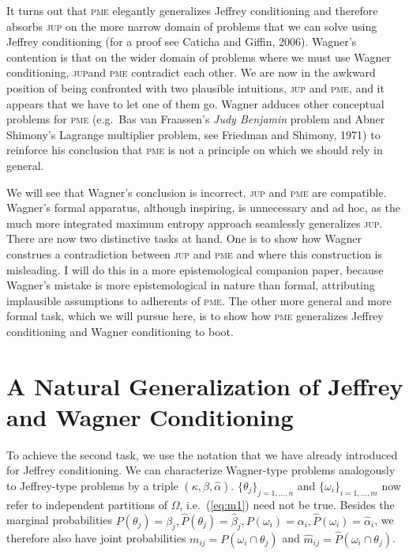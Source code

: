 \documentclass[entropy,article,submit,oneauthor,pdftex,12pt,a4paper]{mdpi}
\begin{document}
It turns out that \textsc{pme} elegantly generalizes Jeffrey
conditioning and therefore absorbs \textsc{jup} on the more narrow
domain of problems that we can solve using Jeffrey conditioning (for a
proof see Caticha and Giffin, 2006). Wagner's contention is that
on the wider domain of problems where we must use Wagner conditioning,
\textsc{jup}and \textsc{pme} contradict each other. We are now in the
awkward position of being confronted with two plausible intuitions,
\textsc{jup} and \textsc{pme}, and it appears that we have to let one
of them go. Wagner adduces other conceptual problems for \textsc{pme}
(e.g.\ Bas van Fraassen's \emph{Judy Benjamin} problem and Abner
Shimony's Lagrange multiplier problem, see
Friedman and Shimony, 1971) to reinforce his conclusion that
\textsc{pme} is not a principle on which we should rely in general.

We will see that Wagner's conclusion is incorrect. \textsc{jup} and
\textsc{pme} are compatible. Wagner's formal apparatus, although
inspiring, is unnecessary and ad hoc, as the much more integrated
maximum entropy approach seamlessly generalizes \textsc{jup}. There
are now two distinctive tasks at hand. One is to show how Wagner
construes a contradiction between \textsc{jup} and \textsc{pme} and
where this construction is misleading. I will do this in a more
epistemological companion paper, because Wagner's mistake is more
epistemological in nature than formal, attributing implausible
assumptions to adherents of \textsc{pme}. The other more general and
more formal task, which we will pursue here, is to show how
\textsc{pme} generalizes Jeffrey conditioning and Wagner conditioning
to boot.

\section{A Natural Generalization of Jeffrey and Wagner Conditioning}
\label{Generalization}

To achieve the second task, we use the notation that we have already
introduced for Jeffrey conditioning. We can characterize Wagner-type
problems analogously to Jeffrey-type problems by a triple
$(\kappa,\beta,\hat{\alpha})$.
$\{\theta_{j}\}_{j=1,\ldots,n}$ and $\{\omega_{i}\}_{i=1,\ldots,m}$
now refer to independent partitions of $\Omega$, i.e.\ (\ref{eq:m1})
need not be true. Besides the marginal probabilities
$P(\theta_{j})=\beta_{j}, \hat{P}(\theta_{j})=\hat{\beta}_{j},
P(\omega_{i})=\alpha_{i},\hat{P}(\omega_{i})=\hat{\alpha}_{i}$, we
therefore also have joint probabilities
$m_{ij}=P(\omega_{i}\cap\theta_{j})$ and
$\hat{m}_{ij}=\hat{P}(\omega_{i}\cap\theta_{j})$.
\end{document}
